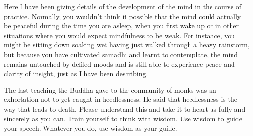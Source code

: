 Here I have been giving details of the development of the mind in the course of practice. Normally, you wouldn't think it possible that the mind could actually be peaceful during the time you are asleep, when you first wake up or in other situations where you would expect mindfulness to be weak. For instance, you might be sitting down soaking wet having just walked through a heavy rainstorm, but because you have cultivated sam\=adhi and learnt to contemplate, the mind remains untouched by defiled moods and is still able to experience peace and clarity of insight, just as I have been describing.

The last teaching the Buddha gave to the community of monks was an exhortation not to get caught in heedlessness. He said that heedlessness is the way that leads to death. Please understand this and take it to heart as fully and sincerely as you can. Train yourself to think with wisdom. Use wisdom to guide your speech. Whatever you do, use wisdom as your guide. 
